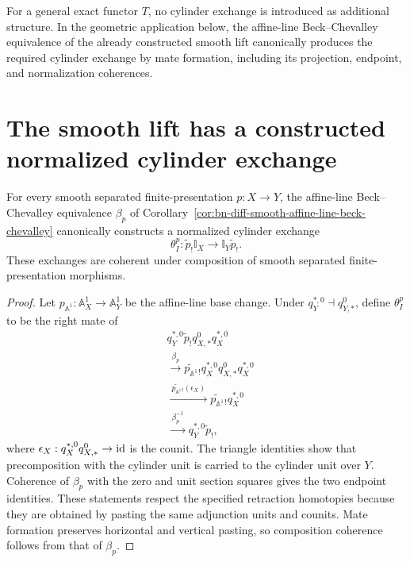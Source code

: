 For a general exact functor \(T\), no cylinder exchange is introduced as
additional structure.  In the geometric application below, the affine-line
Beck--Chevalley equivalence of the already constructed smooth lift canonically
produces the required cylinder exchange by mate formation, including its
projection, endpoint, and normalization coherences.

\section{The smooth lift has a constructed normalized cylinder exchange}
\label{sec:bn-diff-smooth-cylinder-exchange}

\begin{theorem}
\label{thm:bn-diff-smooth-cylinder-exchange}
\label{def:bn-diff-normalized-cylinder-exchange}
For every smooth separated finite-presentation
\(p:X\to Y\), the affine-line Beck--Chevalley equivalence
\(\beta_p\) of
Corollary~\ref{cor:bn-diff-smooth-affine-line-beck-chevalley} canonically
constructs a normalized cylinder exchange
\[
  \boxed{
  \theta_I^p:
  \widetilde p_!\mathbb I_X
  \longrightarrow
  \mathbb I_Y\widetilde p_!.
  }
\]
These exchanges are coherent under composition of smooth separated
finite-presentation morphisms.
\end{theorem}

\begin{proof}
Let
\(p_{\mathbb A^1}:\mathbb A^1_X\to\mathbb A^1_Y\) be the affine-line base
change.  Under
\(q_Y^{*,0}\dashv q_{Y,*}^0\), define \(\theta_I^p\) to be the right mate of
\[
\begin{aligned}
&q_Y^{*,0}\widetilde p_!
 q_{X,*}^0q_X^{*,0}
\\
&\xrightarrow{\ \beta_p\ }
\widetilde{p_{\mathbb A^1}}{}_!
 q_X^{*,0}q_{X,*}^0q_X^{*,0}
\\
&\xrightarrow{\ \widetilde{p_{\mathbb A^1}}{}_!(\epsilon_X)\ }
\widetilde{p_{\mathbb A^1}}{}_!q_X^{*,0}
\\
&\xrightarrow{\ \beta_p^{-1}\ }
q_Y^{*,0}\widetilde p_!,
\end{aligned}
\]
where \(\epsilon_X:q_X^{*,0}q_{X,*}^0\to\operatorname{id}\) is the counit.  The triangle
identities show that precomposition with the cylinder unit is carried to the
cylinder unit over \(Y\).  Coherence of \(\beta_p\) with the zero and unit
section squares gives the two endpoint identities.  These statements respect
the specified retraction homotopies because they are obtained by pasting the
same adjunction units and counits.  Mate formation preserves horizontal and
vertical pasting, so composition coherence follows from that of \(\beta_p\).
\end{proof}

